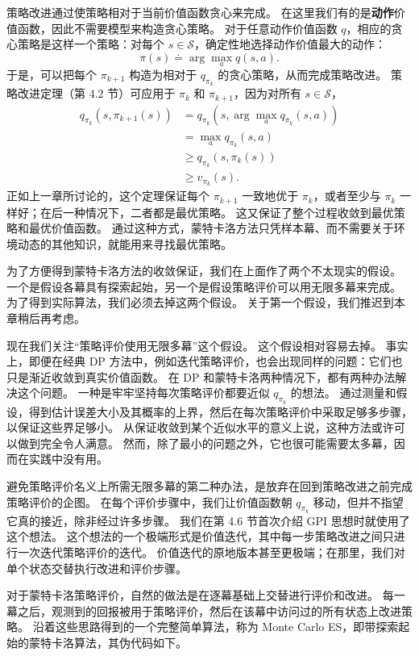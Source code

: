 \documentclass[UTF8,12pt,a4paper,fontset=fandol]{ctexart}
\begin{document}
策略改进通过使策略相对于当前价值函数贪心来完成。
在这里我们有的是\textbf{动作}价值函数，因此不需要模型来构造贪心策略。
对于任意动作价值函数 $q$，相应的贪心策略是这样一个策略：对每个 $s\in\mathcal{S}$，确定性地选择动作价值最大的动作：
\begin{equation}
\pi(s)\doteq \arg\max_a q(s,a).
\end{equation}
于是，可以把每个 $\pi_{k+1}$ 构造为相对于 $q_{\pi_k}$ 的贪心策略，从而完成策略改进。
策略改进定理（第 4.2 节）可应用于 $\pi_k$ 和 $\pi_{k+1}$，因为对所有 $s\in\mathcal{S}$，
\[
\begin{aligned}
q_{\pi_k}(s,\pi_{k+1}(s))
&= q_{\pi_k}\!\left(s,\arg\max_a q_{\pi_k}(s,a)\right)\\
&= \max_a q_{\pi_k}(s,a)\\
&\ge q_{\pi_k}(s,\pi_k(s))\\
&\ge v_{\pi_k}(s).
\end{aligned}
\]
正如上一章所讨论的，这个定理保证每个 $\pi_{k+1}$ 一致地优于 $\pi_k$，或者至少与 $\pi_k$ 一样好；在后一种情况下，二者都是最优策略。
这又保证了整个过程收敛到最优策略和最优价值函数。
通过这种方式，蒙特卡洛方法只凭样本幕、而不需要关于环境动态的其他知识，就能用来寻找最优策略。

为了方便得到蒙特卡洛方法的收敛保证，我们在上面作了两个不太现实的假设。
一个是假设各幕具有探索起始，另一个是假设策略评价可以用无限多幕来完成。
为了得到实际算法，我们必须去掉这两个假设。
关于第一个假设，我们推迟到本章稍后再考虑。

现在我们关注“策略评价使用无限多幕”这个假设。
这个假设相对容易去掉。
事实上，即便在经典 DP 方法中，例如迭代策略评价，也会出现同样的问题：它们也只是渐近收敛到真实价值函数。
在 DP 和蒙特卡洛两种情况下，都有两种办法解决这个问题。
一种是牢牢坚持每次策略评价都要近似 $q_{\pi_k}$ 的想法。
通过测量和假设，得到估计误差大小及其概率的上界，然后在每次策略评价中采取足够多步骤，以保证这些界足够小。
从保证收敛到某个近似水平的意义上说，这种方法或许可以做到完全令人满意。
然而，除了最小的问题之外，它也很可能需要太多幕，因而在实践中没有用。

避免策略评价名义上所需无限多幕的第二种办法，是放弃在回到策略改进之前完成策略评价的企图。
在每个评价步骤中，我们让价值函数朝 $q_{\pi_k}$ 移动，但并不指望它真的接近，除非经过许多步骤。
我们在第 4.6 节首次介绍 GPI 思想时就使用了这个想法。
这个想法的一个极端形式是价值迭代，其中每一步策略改进之间只进行一次迭代策略评价的迭代。
价值迭代的原地版本甚至更极端；在那里，我们对单个状态交替执行改进和评价步骤。

对于蒙特卡洛策略评价，自然的做法是在逐幕基础上交替进行评价和改进。
每一幕之后，观测到的回报被用于策略评价，然后在该幕中访问过的所有状态上改进策略。
沿着这些思路得到的一个完整简单算法，称为 Monte Carlo ES，即带探索起始的蒙特卡洛算法，其伪代码如下。
\end{document}
